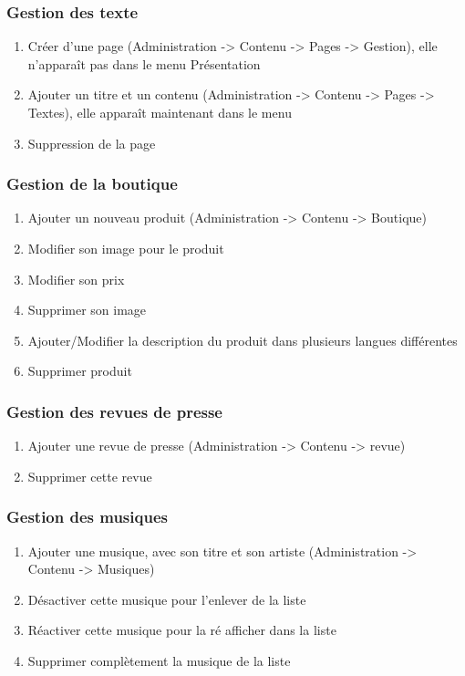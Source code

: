 \documentclass[11pt]{report}
\begin{document}
\subsubsection*{Gestion des texte}
\begin{enumerate}
\item Créer d’une page (Administration -> Contenu -> Pages -> Gestion), elle 
n’apparaît pas dans le menu \og Présentation \fg{}
\item Ajouter un titre et un contenu (Administration -> Contenu -> Pages -> 
Textes), elle apparaît maintenant dans le menu
\item Suppression de la page
\end{enumerate}
\subsubsection*{Gestion de la boutique}
\begin{enumerate}
\item Ajouter un nouveau produit (Administration -> Contenu -> Boutique)
\item Modifier son image pour le produit
\item Modifier son prix
\item Supprimer son image
\item Ajouter/Modifier la description du produit dans plusieurs langues différentes
\item Supprimer produit
\end{enumerate}
\subsubsection*{Gestion des revues de presse}
\begin{enumerate}
\item Ajouter une revue de presse (Administration -> Contenu -> revue)
\item Supprimer cette revue
\end{enumerate}
\subsubsection*{Gestion des musiques}
\begin{enumerate}
\item Ajouter une musique, avec son titre et son artiste (Administration -> Contenu -> Musiques)
\item Désactiver cette musique pour l’enlever de la liste
\item Réactiver cette musique pour la ré afficher dans la liste
\item Supprimer complètement la musique de la liste
\end{enumerate}
\end{document}
